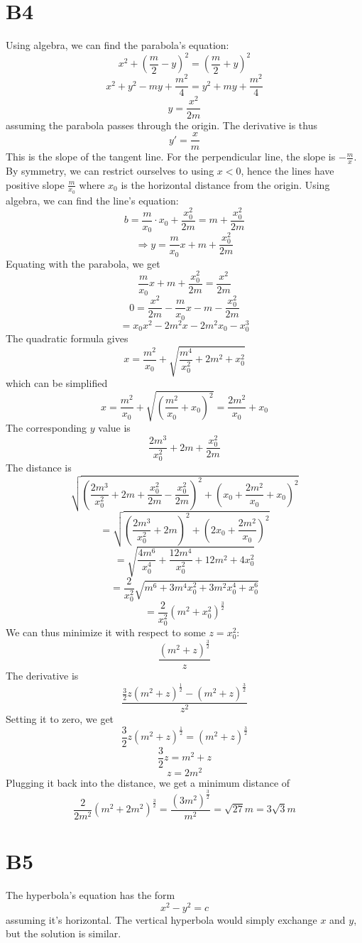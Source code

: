 \documentclass{book}
\begin{document}
\section*{B4}
Using algebra, we can find the parabola's equation:
$$x^2 + \left( \frac{m}{2} - y \right)^2 = \left( \frac{m}{2} + y \right)^2$$
$$x^2 + y^2 - my + \frac{m^2}{4} = y^2 + my + \frac{m^2}{4}$$
$$y = \frac{x^2}{2m}$$
assuming the parabola passes through the origin. The derivative is thus
$$y' = \frac{x}{m}$$
This is the slope of the tangent line. For the perpendicular line, the slope is $-\frac{m}{x}$. By symmetry, we can restrict ourselves to using $x < 0$, hence the lines have positive slope $\frac{m}{x_0}$ where $x_0$ is the horizontal distance from the origin. Using algebra, we can find the line's equation:
$$b = \frac{m}{x_0} \cdot x_0 + \frac{x_0^2}{2m} = m + \frac{x_0^2}{2m}$$
$$\Rightarrow y = \frac{m}{x_0} x + m + \frac{x_0^2}{2m}$$
Equating with the parabola, we get
$$\frac{m}{x_0} x + m + \frac{x_0^2}{2m} = \frac{x^2}{2m}$$
$$0 = \frac{x^2}{2m} - \frac{m}{x_0} x - m - \frac{x_0^2}{2m}$$
$$= x_0 x^2 - 2m^2 x - 2m^2 x_0 - x_0^3$$
The quadratic formula gives
$$x = \frac{m^2}{x_0} + \sqrt{\frac{m^4}{x_0^2} + 2m^2 + x_0^2}$$
which can be simplified
$$x = \frac{m^2}{x_0} + \sqrt{\left( \frac{m^2}{x_0} + x_0 \right)^2} = \frac{2m^2}{x_0} + x_0$$
The corresponding $y$ value is
$$\frac{2m^3}{x_0^2} + 2m + \frac{x_0^2}{2m}$$
The distance is
$$\sqrt{\left( \frac{2m^3}{x_0^2} + 2m + \frac{x_0^2}{2m} - \frac{x_0^2}{2m} \right)^2 + \left( x_0 + \frac{2m^2}{x_0} + x_0 \right)^2}$$
$$= \sqrt{\left( \frac{2m^3}{x_0^2} + 2m \right)^2 + \left( 2x_0 + \frac{2m^2}{x_0} \right)^2}$$
$$= \sqrt{\frac{4m^6}{x_0^4} + \frac{12m^4}{x_0^2} + 12m^2 + 4x_0^2}$$
$$= \frac{2}{x_0^2}\sqrt{m^6 + 3m^4 x_0^2 + 3m^2 x_0^4 + x_0^6}$$
$$= \frac{2}{x_0^2}(m^2 + x_0^2)^\frac{3}{2}$$
We can thus minimize it with respect to some $z = x_0^2$:
$$\frac{(m^2 + z)^\frac{3}{2}}{z}$$
The derivative is
$$\frac{\frac{3}{2}z(m^2 + z)^\frac{1}{2} - (m^2 + z)^\frac{3}{2}}{z^2}$$
Setting it to zero, we get
$$\frac{3}{2}z(m^2 + z)^\frac{1}{2} = (m^2 + z)^\frac{3}{2}$$
$$\frac{3}{2}z = m^2 + z$$
$$z = 2m^2$$
Plugging it back into the distance, we get a minimum distance of
$$\frac{2}{2m^2}(m^2 + 2m^2)^\frac{3}{2} = \frac{(3m^2)^\frac{3}{2}}{m^2} = \sqrt{27} m = 3\sqrt{3} m$$

\section*{B5}
The hyperbola's equation has the form
$$x^2 - y^2 = c$$
assuming it's horizontal. The vertical hyperbola would simply exchange $x$ and $y$, but the solution is similar.
\end{document}
